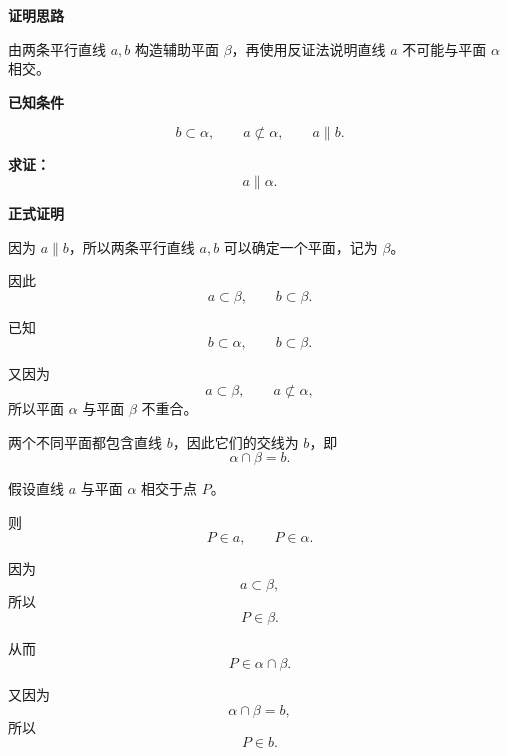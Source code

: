 \begin{proofbox}
    \textbf{\textcolor{CProof}{证明思路}}

    由两条平行直线 $a,b$ 构造辅助平面 $\beta$，再使用反证法说明直线 $a$ 不可能与平面 $\alpha$ 相交。

    \medskip
    \textbf{\textcolor{CProof}{已知条件}}

    \[
        b\subset\alpha,
        \qquad
        a\not\subset\alpha,
        \qquad
        a\parallel b.
    \]

    \textbf{求证：}
    \[
        a\parallel\alpha.
    \]

    \medskip
    \textbf{\textcolor{CProof}{正式证明}}

    \begin{description}[
        style=nextline,
        leftmargin=2.8em,
        labelsep=0.5em,
        itemsep=0.55em
    ]
        \item[\textbf{步骤一（构造辅助平面）：}]
        因为 $a\parallel b$，所以两条平行直线 $a,b$ 可以确定一个平面，记为 $\beta$。

        因此
        \[
            a\subset\beta,
            \qquad
            b\subset\beta.
        \]

        \item[\textbf{步骤二（确定两平面的交线）：}]
        已知
        \[
            b\subset\alpha,
            \qquad
            b\subset\beta.
        \]

        又因为
        \[
            a\subset\beta,
            \qquad
            a\not\subset\alpha,
        \]
        所以平面 $\alpha$ 与平面 $\beta$ 不重合。

        两个不同平面都包含直线 $b$，因此它们的交线为 $b$，即
        \[
            \alpha\cap\beta=b.
        \]

        \item[\textbf{步骤三（反设线面相交）：}]
        假设直线 $a$ 与平面 $\alpha$ 相交于点 $P$。

        则
        \[
            P\in a,
            \qquad
            P\in\alpha.
        \]

        因为
        \[
            a\subset\beta,
        \]
        所以
        \[
            P\in\beta.
        \]

        从而
        \[
            P\in\alpha\cap\beta.
        \]

        又因为
        \[
            \alpha\cap\beta=b,
        \]
        所以
        \[
            P\in b.
        \]


\end{description}
\end{proofbox}

